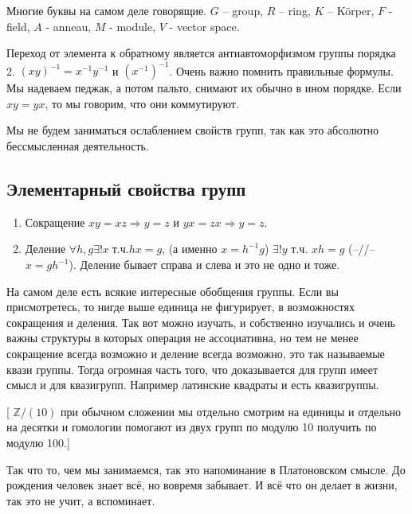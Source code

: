 Многие буквы на самом деле говорящие. $G$ – group, $R$ – ring, $K$ – Körper,
$F$ - field, $A$ - anneau, $M$ - module, $V$ - vector space.

Переход от элемента к обратному является антиавтоморфизмом группы порядка 2.
$(xy)^{-1} = x^{-1}y^{-1}$ и $(x^{-1})^{-1}$. Очень важно помнить правильные
формулы. Мы надеваем педжак, а потом пальто, снимают их обычно в ином порядке.
Если $xy=yx$, то мы говорим, что они коммутируют.

Мы не будем заниматься ослаблением свойств групп, так как это абсолютно
бессмысленная деятельность.

\subsection{Элементарный свойства групп}
\begin{enumerate}
    \item Сокращение $xy = xz\Rightarrow y=z$ и $yx=zx\Rightarrow y=z$.
    \item Деление $\forall h,g\exists !x\;\text{т.ч.} hx=g$, (а именно
        $x=h^{-1}g$) $\exists!y$ т.ч. $xh=g$ (–//– $x=gh^{-1}$). Деление
        бывает справа и слева и это не одно и тоже.
\end{enumerate}

На самом деле есть всякие интересные обобщения группы. Если вы присмотретесь,
то нигде выше единица не фигурирует, в возможностях сокращения и деления. Так
вот можно изучать, и собственно изучались и очень важны структуры в которых
операция не ассоциативна, но тем не менее сокращение всегда возможно и деление
всегда возможно, это так называемые квази группы. Тогда огромная часть того,
что доказывается для групп имеет смысл и для квазигрупп. Например латинские
квадраты и есть квазигруппы. 

[ $\mathbb{Z}/(10)$ при обычном сложении мы отдельно смотрим на единицы и
отдельно на десятки и гомологии помогают из двух групп по модулю 10 получить
по модулю 100.]

Так что то, чем мы занимаемся, так это напоминание в Платоновском смысле. До
рождения человек знает всё, но вовремя забывает. И всё что он делает в жизни,
так это не учит, а вспоминает.

